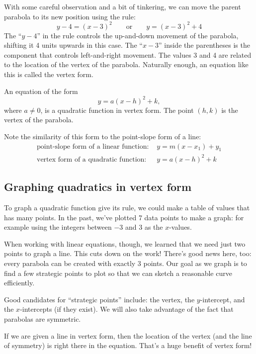 With some careful observation and a bit of tinkering, we can move the parent parabola to its new position using the rule:
\[y-4=(x-3)^2 \qquad\text{or}\qquad y = (x-3)^2+4\]
The ``$y-4$'' in the rule controls the up-and-down movement of the parabola, shifting it 4 units upwards in this case. The ``$x-3$'' inside the parentheses is the component that controls left-and-right movement. The values 3 and 4 are related to the location of the vertex of the parabola. Naturally enough, an equation like this is called the \gls{vertex form}.

\begin{boxdef}
An equation of the form \[y = a(x-h)^2 + k,\] where $a\neq0$, is a quadratic function in vertex form. The point $(h,k)$ is the vertex of the parabola.
\end{boxdef}

Note the similarity of this form to the point-slope form of a line:
\[\begin{array}{rl}
\text{point-slope form of a linear function: } & y = m(x-x_1) + y_1\\
\text{vertex form of a quadratic function: } & y = a(x-h)^2 + k
\end{array}\]


\subsection{Graphing quadratics in vertex form}

To graph a quadratic function give its rule, we could make a table of values that has many points. In the past, we've plotted 7 data points to make a graph: for example using the integers between $-3$ and 3 as the $x$-values.

When working with linear equations, though, we learned that we need just two points to graph a line. This cuts down on the work! There's good news here, too: every parabola can be created with exactly 3 points. Our goal as we graph is to find a few strategic points to plot so that we can sketch a reasonable curve efficiently.

Good candidates for ``strategic points'' include: the vertex, the $y$-intercept, and the $x$-intercepts (if they exist). We will also take advantage of the fact that parabolas are symmetric.

If we are given a line in vertex form, then the location of the vertex (and the line of
symmetry) is right there in the equation. That's a huge benefit of vertex form!

